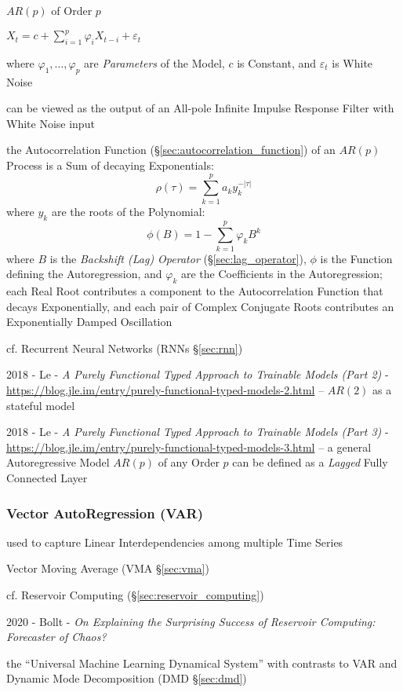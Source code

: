 $AR(p)$ of Order $p$

$X_t = c + \sum_{i=1}^p \varphi_i X_{t-i} + \varepsilon_t$

where $\varphi_1, \ldots, \varphi_p$ are \emph{Parameters} of the Model, $c$ is
Constant, and $\varepsilon_t$ is White Noise

can be viewed as the output of an All-pole Infinite Impulse Response Filter with
White Noise input

the Autocorrelation Function (\S\ref{sec:autocorrelation_function}) of an
$AR(p)$ Process is a Sum of decaying Exponentials:
\[
  \rho(\tau) = \sum_{k=1}^p a_k y_k^{-|\tau|}
\]
where $y_k$ are the roots of the Polynomial:
\[
  \phi(B) = 1 - \sum_{k=1}^p \varphi_k B^k
\]
where $B$ is the \emph{Backshift (Lag) Operator} (\S\ref{sec:lag_operator}),
$\phi$ is the Function defining the Autoregression, and $\varphi_k$ are the
Coefficients in the Autoregression;
each Real Root contributes a component to the Autocorrelation Function that
decays Exponentially, and each pair of Complex Conjugate Roots contributes an
Exponentially Damped Oscillation

\fist cf. Recurrent Neural Networks (RNNs \S\ref{sec:rnn})

2018 - Le -
\emph{A Purely Functional Typed Approach to Trainable Models (Part 2)} -
\url{https://blog.jle.im/entry/purely-functional-typed-models-2.html}
-- $AR(2)$ as a stateful model

2018 - Le -
\emph{A Purely Functional Typed Approach to Trainable Models (Part 3)} -
\url{https://blog.jle.im/entry/purely-functional-typed-models-3.html}
-- a general Autoregressive Model $AR(p)$ of any Order $p$ can be defined as a
\emph{Lagged} Fully Connected Layer




\subsubsection{Vector AutoRegression (VAR)}\label{sec:var}

used to capture Linear Interdependencies among multiple Time Series

Vector Moving Average (VMA \S\ref{sec:vma})

cf. Reservoir Computing (\S\ref{sec:reservoir_computing})

2020 - Bollt - \emph{On Explaining the Surprising Success of Reservoir
  Computing: Forecaster of Chaos?}

the ``Universal Machine Learning Dynamical System'' with contrasts to VAR and
Dynamic Mode Decomposition (DMD \S\ref{sec:dmd})



